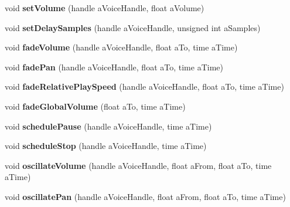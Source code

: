 \begin{DoxyCompactItemize}
void {\bfseries set\+Volume} (handle a\+Voice\+Handle, float a\+Volume)
\item 
\mbox{\label{class_so_loud_1_1_soloud_a009c703c8db214d6452b77456f57b56a}} 
void {\bfseries set\+Delay\+Samples} (handle a\+Voice\+Handle, unsigned int a\+Samples)
\item 
\mbox{\label{class_so_loud_1_1_soloud_af6ac66de9742499dd616de099758f344}} 
void {\bfseries fade\+Volume} (handle a\+Voice\+Handle, float a\+To, time a\+Time)
\item 
\mbox{\label{class_so_loud_1_1_soloud_aaac0c9adda71d06262455b78dea8d965}} 
void {\bfseries fade\+Pan} (handle a\+Voice\+Handle, float a\+To, time a\+Time)
\item 
\mbox{\label{class_so_loud_1_1_soloud_aa056f4f17f729fe00db005b5ecc4b565}} 
void {\bfseries fade\+Relative\+Play\+Speed} (handle a\+Voice\+Handle, float a\+To, time a\+Time)
\item 
\mbox{\label{class_so_loud_1_1_soloud_a4722c8b333f053aa5e41f73283cadfad}} 
void {\bfseries fade\+Global\+Volume} (float a\+To, time a\+Time)
\item 
\mbox{\label{class_so_loud_1_1_soloud_aafbb714419cbf0ac4cbc14c06aaf3fd7}} 
void {\bfseries schedule\+Pause} (handle a\+Voice\+Handle, time a\+Time)
\item 
\mbox{\label{class_so_loud_1_1_soloud_a00c9b4715e18143d3f13ae9c42d2ae45}} 
void {\bfseries schedule\+Stop} (handle a\+Voice\+Handle, time a\+Time)
\item 
\mbox{\label{class_so_loud_1_1_soloud_a260cb4446fc97249cfd9c353020bfafa}} 
void {\bfseries oscillate\+Volume} (handle a\+Voice\+Handle, float a\+From, float a\+To, time a\+Time)
\item 
\mbox{\label{class_so_loud_1_1_soloud_aa8843cec3f6cfff5a3e6652f890e470e}} 
void {\bfseries oscillate\+Pan} (handle a\+Voice\+Handle, float a\+From, float a\+To, time a\+Time)
\item 

\end{DoxyCompactItemize}
